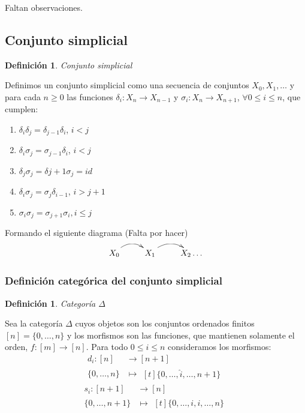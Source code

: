 \documentclass[11pt,a4paper,openright,oneside]{article}
\numberwithin{equation}{section}
\newtheorem{defi}[teo]{Definici\'on}
\theoremstyle{definition}
\begin{document}
Faltan observaciones.

\subsection{Conjunto simplicial}
\begin{defi}
    Conjunto simplicial
\end{defi}
Definimos un conjunto simplicial como una secuencia de conjuntos $X_0,X_1,\dots$ y para cada $n\ge 0$ las funciones $\delta_i: X_n \longrightarrow X_{n-1}$ y $\sigma_i: X_n \longrightarrow X_{n+1}$, $\forall 0\le i \le n$, que cumplen:

\begin{enumerate}[(1)]
    \item $\delta_i\delta_j = \delta_{j-1}\delta_{i}$, $i<j$
    \item $\delta_i\sigma_j = \sigma_{j-1}\delta_{i}$, $i<j$
    \item $\delta_j\sigma_j = \delta{j+1}\sigma_{j} = id$
    \item $\delta_i\sigma_j = \sigma_{j}\delta_{i-1}$, $i>j+1$
    \item $\sigma_i\sigma_j = \sigma_{j+1}\sigma_{i}, i\le j$
\end{enumerate}
Formando el siguiente diagrama (Falta por hacer)

$$ %
    \xymatrix{
    X_0  \ar@/{}^{1pc}/[r]  & X_1  \ar@/{}^{1pc}/[r] & X_2  \dots
    }
$$

\subsubsection{Definici\'on categ\'orica del conjunto simplicial}
\begin{defi}
    Categor\'ia $\Delta$
\end{defi}
Sea la categor\'ia $\Delta$ cuyos objetos son los conjuntos ordenados finitos $[n] = \{0,\dots,n\}$ y los morfismos son las funciones, que mantienen solamente el orden, $f: [m] \longrightarrow [n]$.
Para todo $0\le i \le n$ consideramos los morfismos:
\begin{align*}
    d_i: [n]      & \longrightarrow [n+1] \\
    \{0,\dots,n\} & \longmapsto\!
    \begin{aligned}[t]
        \{0,\dots, \hat{i}, \dots,n+1\}
    \end{aligned}
\end{align*}
\begin{align*}
    s_i: [n+1]      & \longrightarrow [n] \\
    \{0,\dots,n+1\} & \longmapsto\!
    \begin{aligned}[t]
        \{0,\dots,i,i, \dots,n\}
    \end{aligned}
\end{align*}
\end{document}
